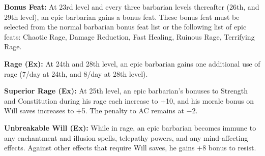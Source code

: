 \textbf{Bonus Feat:} At 23rd level and every three barbarian levels thereafter (26th, and 29th level), an epic barbarian gains a bonus feat. These bonus feat must be selected from the normal barbarian bonus feat list or the following list of epic feats:
Chaotic Rage,
Damage Reduction,
Fast Healing,
Ruinous Rage,
Terrifying Rage.

\textbf{Rage (Ex):} At 24th and 28th level, an epic barbarian gains one additional use of rage (7/day at 24th, and 8/day at 28th level).

\textbf{Superior Rage (Ex):} At 25th level, an epic barbarian's bonuses to Strength and Constitution during his rage each increase to +10, and his morale bonus on Will saves increases to +5. The penalty to AC remains at $-2$.

\textbf{Unbreakable Will (Ex):} While in rage, an epic barbarian becomes immune to any enchantment and illusion spells, telepathy powers, and any mind-affecting effects. Against other effects that require Will saves, he gains +8 bonus to resist.